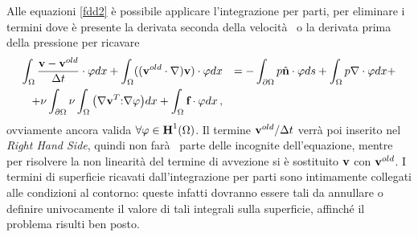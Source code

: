 Alle equazioni \eqref{fdd2} \`e possibile applicare l'integrazione per parti, 
per eliminare i termini dove è presente la derivata seconda della velocità 
o la derivata prima della pressione per ricavare
\begin{eqnarray} \label{fd33}
	\int_{\Omega} \frac{ {\bf v}-{\bf v}^{old} }{\Delta t} \cdot {\bf \varphi} dx + 
	\int_{\Omega} (({\bf v}^{old} \cdot \nabla){\bf v})\cdot {\bf \varphi} dx &&= \nonumber
	-\int_{\partial\Omega}p \hat{{\bf n}} \cdot {\bf \varphi}ds+\int_{\Omega} p 
	\nabla \cdot {\bf \varphi}dx+ \\  +\nu \int_{\partial \Omega} 
	\nu \int_{\Omega} \big( \nabla {\bf v}^{T}{\bf :} 
	\nabla{\bf \varphi} \big) dx +\int_{\Omega} \textbf{f}\cdot
	{\bf \varphi}dx \,,  
\end{eqnarray}
ovviamente ancora valida $\forall  {\bf \varphi}\in \textbf{H}^{1}(\Omega)$. Il termine 
${{\bf v}^{old}}/{\Delta t}$ verr\`a poi inserito nel \textit{Right Hand Side}, 
quindi non farà  parte delle incognite dell'equazione, mentre per risolvere la non linearità 
del termine di avvezione si è sostituito ${\bf v}$ con ${\bf v}^{old}$.
I termini di superficie ricavati dall'integrazione per parti sono intimamente collegati 
alle condizioni al contorno: queste infatti dovranno essere tali da annullare
o definire univocamente il valore di tali integrali sulla superficie, 
affinché il problema risulti ben posto.

